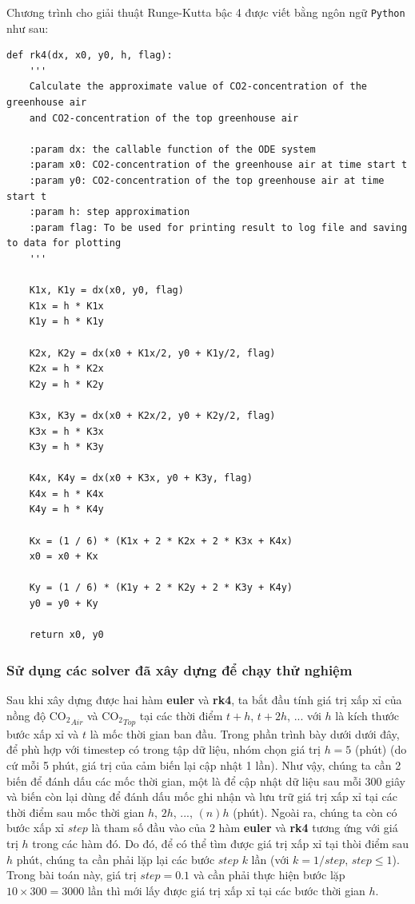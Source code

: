 \documentclass[a4paper]{article}
\begin{document}
Chương trình cho giải thuật Runge-Kutta bậc 4 được viết bằng ngôn ngữ \texttt{Python} như sau:

\begin{verbatim}
def rk4(dx, x0, y0, h, flag):
    '''
    Calculate the approximate value of CO2-concentration of the greenhouse air
    and CO2-concentration of the top greenhouse air

    :param dx: the callable function of the ODE system
    :param x0: CO2-concentration of the greenhouse air at time start t
    :param y0: CO2-concentration of the top greenhouse air at time start t
    :param h: step approximation
    :param flag: To be used for printing result to log file and saving to data for plotting
    '''

    K1x, K1y = dx(x0, y0, flag)
    K1x = h * K1x
    K1y = h * K1y

    K2x, K2y = dx(x0 + K1x/2, y0 + K1y/2, flag)
    K2x = h * K2x
    K2y = h * K2y

    K3x, K3y = dx(x0 + K2x/2, y0 + K2y/2, flag)
    K3x = h * K3x
    K3y = h * K3y

    K4x, K4y = dx(x0 + K3x, y0 + K3y, flag)
    K4x = h * K4x
    K4y = h * K4y

    Kx = (1 / 6) * (K1x + 2 * K2x + 2 * K3x + K4x)
    x0 = x0 + Kx

    Ky = (1 / 6) * (K1y + 2 * K2y + 2 * K3y + K4y)
    y0 = y0 + Ky

    return x0, y0
\end{verbatim}

\subsubsection{Sử dụng các solver đã xây dựng để chạy thử nghiệm}
Sau khi xây dựng được hai hàm \textbf{euler} và \textbf{rk4}, ta bắt đầu tính giá trị xấp xỉ của nồng độ $\mathrm{CO_{2}}_{Air}$ và $\mathrm{CO_{2}}_{Top}$ tại các thời điểm $t + h$, $t + 2h$, $...$ với $h$ là kích thước bước xấp xỉ và $t$ là mốc thời gian ban đầu. Trong phần trình bày dưới dưới đây, để phù hợp với timestep có trong tập dữ liệu, nhóm chọn giá trị $h = 5$ (phút) (do cứ mỗi 5 phút, giá trị của cảm biến lại cập nhật 1 lần). Như vậy, chúng ta cần 2 biến để đánh dấu các mốc thời gian, một là để cập nhật dữ liệu sau mỗi 300 giây và biến còn lại dùng để đánh dấu mốc ghi nhận và lưu trữ giá trị xấp xỉ tại các thời điểm sau mốc thời gian $h$, $2h$, $...$, $(n)h$ (phút). Ngoài ra, chúng ta còn có bước xấp xỉ $step$ là tham số đầu vào của 2 hàm \textbf{euler} và \textbf{rk4} tương ứng với giá trị $h$ trong các hàm đó. Do đó, để có thể tìm được giá trị xấp xỉ tại thòi điểm sau $h$ phút, chúng ta cần phải lặp lại các bước $step$ $k$ lần (với $k = 1/step$, $step \leq 1$). Trong bài toán này, giá trị $step = 0.1$ và cần phải thực hiện bước lặp $10 \times 300 = 3000$ lần thì mới lấy được giá trị xấp xỉ tại các bước thời gian $h$. \par
\end{document}

